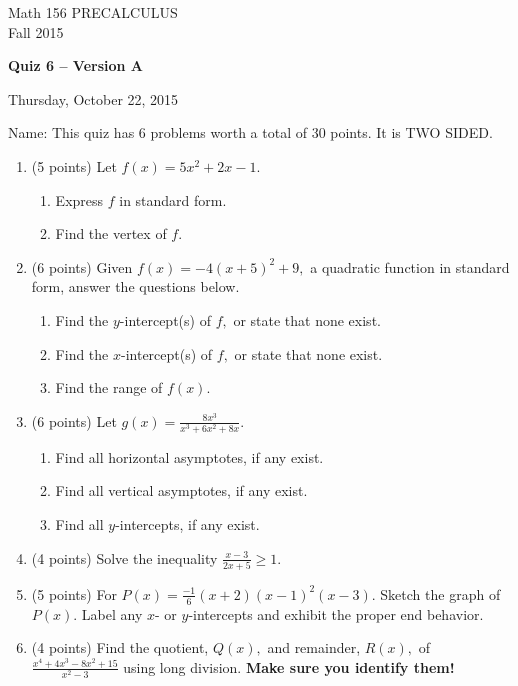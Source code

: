 \documentclass[11pt]{article}
\begin{document}
\begin{center}
\vspace{2in}

\huge{Math 156 PRECALCULUS \\
Fall 2015}

\vfill

\huge{\bf{Quiz 6 -- Version A}}\\

\vspace{0.5in}

\large{Thursday, October 22, 2015}\\

\vfill


{\huge{Name:{\underline{\hspace{2in}}}}}
\vfill
This quiz has 6 problems worth a total of 30 points. It is TWO SIDED. 
\vfill
\end{center}
\newpage
\restoregeometry
\begin{enumerate}
\item (5 points) Let $f(x)=5x^2+2x-1.$
\begin{enumerate}
\item Express $f$ in standard form.
\vspace{1.5in}
\item Find the vertex of $f.$
\vspace{0.5in}
\end{enumerate}
\item (6 points) Given $f(x)=-4(x+5)^2+9,$ a quadratic function in standard form, answer the questions below.
\begin{enumerate}
\item Find the $y$-intercept(s) of $f,$ or state that none exist.
\vfill
\item Find the $x$-intercept(s) of $f,$ or state that none exist.
\vfill
\item Find the range of $f(x).$
\vfill
\end{enumerate}
\newpage

\item (6 points) Let $g(x)=\frac{8x^3}{x^3+6x^2+8x}.$
\begin{enumerate}
\item Find all horizontal asymptotes, if any exist.
\vfill
\item Find all vertical asymptotes, if any exist.
\vfill
\item Find all $y$-intercepts, if any exist.
\vfill
\end{enumerate}
\item (4 points) Solve the inequality $\frac{x-3}{2x+5}\geq 1.$
\vspace{3in}
\newpage
\item (5 points) For $P(x)=\frac{-1}{6}(x+2)(x-1)^2(x-3).$ Sketch the graph of $P(x).$ Label any $x$- or $y$-intercepts and exhibit the proper end behavior.
\vspace{2in}
\vfill
\item (4 points) Find the quotient, $Q(x),$ and remainder, $R(x),$ of $\frac{x^4+4x^3-8x^2+15}{x^2-3}$ using long division. {\bf{Make sure you identify them!}}
\vfill

\end{enumerate}
\end{document}
